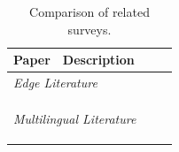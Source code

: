 \begin{table}[t]
    \small
    \centering
    \begin{tabular}{l p{0.70\linewidth}}
        \toprule
        \textbf{Paper} & \textbf{Description} \\
        \midrule
        \multicolumn{2}{l}{\textit{Edge Literature}} \\
        \citet{treviso-etal-2023-efficient}  & \\
        \citet{wan2024efficient}             & \\
        \citet{zheng2025reviewedgeLLM}       & \\
        \midrule
        \multicolumn{2}{l}{\textit{Multilingual Literature}} \\
        \citet{adilazuarda-etal-2024-towards} & \\
        \citet{yong-etal-2025-state} & \\
        \citet{liu-etal-2025-culturally} & \\
        \bottomrule
    \end{tabular}
    \caption{Comparison of related surveys.}
    \label{tab:survey_comparisons}
\end{table}
